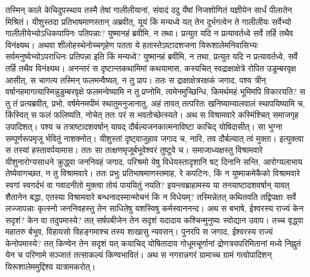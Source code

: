 \adhyAya
{}
\vakya तस्मिन् काले केचिदुपस्थाय तस्मै तेषां गालीलीयानां, संवादं ददु र्येषां निजशोणितं यज्ञीयेन सार्धं पीलातेन मिश्रितं।
\vakya यीशुस्तदा प्रतिभाषमाणस्तान् अब्रवीत्, यूयं किं मन्यध्वे यत् तेन दुर्भगत्वेन ते गालीलीयः सर्वेभ्यो गालीलीयेभ्योऽधिकपापिनः पतिपन्नाः?
\vakya युष्मानहं ब्रवीमि, न तथा। प्रत्युत यदि न प्रत्यावर्तध्वे सर्वे तर्हि तथैव विनंक्ष्यथ।
\vakya अथवा शीलोहस्थेनोच्चगृहेण पतता ये हतास्तेऽष्टादशजना यिरूशालेमनिवासिभ्यः सर्वमनुष्येभ्योऽपराधिनः प्रतिपन्ना इति किं मन्यध्वे?
\vakya युष्मानहं ब्रवीमि, न तथा, प्रत्युत यदि न प्रत्यावर्तध्वे, सर्वे तर्हि तथैव विनंक्ष्यथ।
\vakya अनन्तरं स दृष्टान्तकथामिमां कथयामास, कस्यचित् स्वद्राक्षाक्षेत्रे रोपित उडुम्बरवृक्ष आसीत्, स चागत्य तस्मिन् फलमन्वैष्यत्, न तु प्राप।
\vakya ततः स द्राक्षाक्षेत्ररक्षकं जगाद, पश्य त्रीन् वर्षानहमागत्यास्मिन्नुडुम्बरवृक्षे फलमन्वेष्यामि न तु प्रप्नोमि, त्वमेनमुच्छिन्धि, किमर्थमहं भूमिमपि विकारयति?
\vakya स तु तं प्रत्यब्रवीत्, प्रभो, वर्षमेनमपीमं स्थातुमनुजानातु, अहं तावत् तत्परितः खनिष्याम्यालवालं स्थापयिष्यामि च,
\vakya किंस्वित् स फलं फलिष्यति, नोचेत् ततः परं स भवतोच्छेत्स्यते।
\vakya अथ स विश्रामवारे कस्मिंश्चित् समाजगृह उपादिशत्।
\vakya पश्य च तत्राष्टादशवर्षान् यावद् दौर्बल्यजनकात्मनाविष्टा काचिद् योषिदासीत्। सा भुग्ना सम्पूर्णरूपमृजू र्भवितुं नाशक्नोत्।
\vakya यीशुस्तां दृष्ट्वाजुहाव जगाद च, नारि, तव दौर्बल्यात् त्वं मुक्ता। इत्युक्त्वा स तस्यां हस्तावर्पयामास।
\vakya ततः सा तत्क्षणमृजूर्बभूवेश्वरं तुष्टुवे च। समाजाध्यक्षस्तु विश्रामवारे यीशुनारोग्यसाधने क्रुद्ध्वा जननिवहं जगाद, परिश्रमो येषु विधेयस्तादृशानि षट् दिनानि सन्ति, आरोग्यलाभाय तेष्येवागच्छत, न तु विश्रामवारे।
\vakya ततः प्रभुः प्रतिभाषमाणस्तमाह, रे कपटिनः, किं न युष्माकमेकैको विश्रामवारे स्वगां स्वगर्दभं वा गवादनीतो मुक्त्वा तोयं पाययितुं नयति?
\vakya इयन्त्वब्राहामस्य या तनयाष्टादशवर्षान् यावत् शैतानेन बद्धा, एतस्या विश्रामवारे बन्धनादस्मान्मोचनं किं न विधेयम्?
\vakya तस्मिन्नेतत् कथितवति तद्विपक्षाः सर्वे लज्जापन्नाः कृत्स्नो जननिवहस्तु तेन साधितेषु यशस्विषु कर्मस्वाननन्द।
\vakya अथ स बभाषे, ईश्वरस्य राज्यं केन सदृशं? केन वा तदुपमास्ये?
\vakya तत् सर्षपबीजेन तेन सदृशं यदादाय कश्चिन्मुनुष्यः स्वोद्यान उवाप। तच्च वृद्ध्वा महातरु र्बभूव, विहायसो विहङ्गमाश्च तस्य शाखासु न्यवसन्।
\vakya पुनरपि स जगाद, ईश्वरस्य राज्यं केनोपमास्ये?
\vakya तत् किण्वेन तेन सदृशं यत् कयाचिद् योषितादाय गोधूमचूर्णानां द्रोणत्रयपरिमितानां मध्ये निह्नुतं येन च परिणामे सञ्जातं तत्साकल्यं किण्वभावितं।
\vakya अथ स नगरान्नगरं ग्रामाच्च ग्रामं गत्वोपादिशन् यिरूशालेममुद्दिश्य यात्रामकरोत्।
